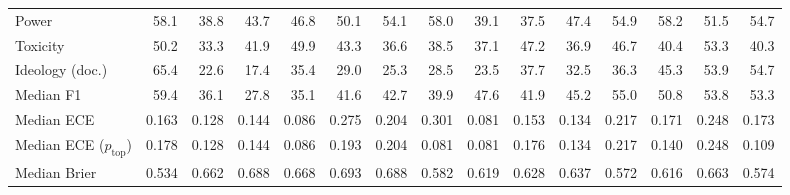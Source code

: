 \begin{tabular}{lrrrrrrrrrrrrrr}
Power & 58.1 & 38.8 & 43.7 & 46.8 & 50.1 & 54.1 & 58.0 & 39.1 & 37.5 & 47.4 & 54.9 & 58.2 & 51.5 & 54.7 \\
Toxicity & 50.2 & 33.3 & 41.9 & 49.9 & 43.3 & 36.6 & 38.5 & 37.1 & 47.2 & 36.9 & 46.7 & 40.4 & 53.3 & 40.3 \\
Ideology (doc.) & 65.4 & 22.6 & 17.4 & 35.4 & 29.0 & 25.3 & 28.5 & 23.5 & 37.7 & 32.5 & 36.3 & 45.3 & 53.9 & 54.7 \\
\midrule
Median F1 & 59.4 & 36.1 & 27.8 & 35.1 & 41.6 & 42.7 & 39.9 & 47.6 & 41.9 & 45.2 & 55.0 & 50.8 & 53.8 & 53.3 \\
Median ECE & 0.163 & 0.128 & 0.144 & 0.086 & 0.275 & 0.204 & 0.301 & 0.081 & 0.153 & 0.134 & 0.217 & 0.171 & 0.248 & 0.173 \\
Median ECE ($p_{\mathrm{top}}$) & 0.178 & 0.128 & 0.144 & 0.086 & 0.193 & 0.204 & 0.081 & 0.081 & 0.176 & 0.134 & 0.217 & 0.140 & 0.248 & 0.109 \\
Median Brier & 0.534 & 0.662 & 0.688 & 0.668 & 0.693 & 0.688 & 0.582 & 0.619 & 0.628 & 0.637 & 0.572 & 0.616 & 0.663 & 0.574 \\
\bottomrule
\end{tabular}

